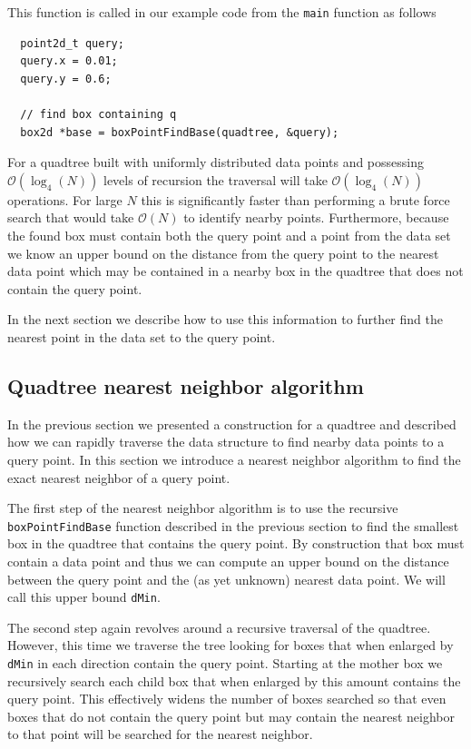 This function is called in our example code from the \texttt{main} function as follows

\begin{verbatim}
  point2d_t query;
  query.x = 0.01;
  query.y = 0.6;

  // find box containing q    
  box2d *base = boxPointFindBase(quadtree, &query);
\end{verbatim}
For a quadtree built with uniformly distributed data points and possessing $\mathcal{O}(\log_4(N))$ levels of recursion the traversal will take $\mathcal{O}(\log_4(N))$ operations. For large $N$ this is significantly faster than performing a brute force search that would take $\mathcal{O}(N)$ to identify nearby points. Furthermore, because the found box must contain both the query point and a point from the data set we know an upper bound on the distance from the query point to the nearest data point which may be contained in a nearby box in the quadtree that does not contain the query point. 

In the next section we describe how to use this information to further find the nearest point in the data set to the query point.

\subsection{Quadtree nearest neighbor algorithm}

In the previous section we presented a construction for a quadtree and described how we can rapidly traverse the data structure to find nearby data points to a query point. In this section we introduce a nearest neighbor algorithm to find the exact nearest neighbor of a query point.

The first step of the nearest neighbor algorithm is to use the recursive \texttt{boxPointFindBase} function described in the previous section to find the smallest box in the quadtree that contains the query point. By construction that box must contain a data point and thus we can compute an upper bound on the distance between the query point and the (as yet unknown) nearest data point. We will call this upper bound \texttt{dMin}. 

The second step again revolves around a recursive traversal of the quadtree. However, this time we traverse the tree looking for boxes that when enlarged by \texttt{dMin} in each direction contain the query point. Starting at the mother box we recursively search each child box that when enlarged by this amount contains the query point. This effectively widens the number of boxes searched so that even boxes that do not contain the query point but may contain the nearest neighbor to that point will be searched for the nearest neighbor.

